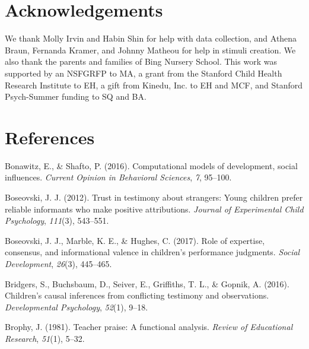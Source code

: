 \documentclass[10pt, letterpaper]{article}
\begin{document}
\section{Acknowledgements}\label{acknowledgements}

We thank Molly Irvin and Habin Shin for help with data collection, and
Athena Braun, Fernanda Kramer, and Johnny Matheou for help in stimuli
creation. We also thank the parents and families of Bing Nursery School.
This work was supported by an NSFGRFP to MA, a grant from the Stanford
Child Health Research Institute to EH, a gift from Kinedu, Inc. to EH
and MCF, and Stanford Psych-Summer funding to SQ and BA.

\vspace{1em}

\vspace{1em}

\section{References}\label{references}

\setlength{\parindent}{-0.1in} \setlength{\leftskip}{0.125in} \noindent

\hypertarget{refs}{}
\hypertarget{ref-bonawitz2016computational}{}
Bonawitz, E., \& Shafto, P. (2016). Computational models of development,
social influences. \emph{Current Opinion in Behavioral Sciences},
\emph{7}, 95--100.

\hypertarget{ref-boseovski2012trust}{}
Boseovski, J. J. (2012). Trust in testimony about strangers: Young
children prefer reliable informants who make positive attributions.
\emph{Journal of Experimental Child Psychology}, \emph{111}(3),
543--551.

\hypertarget{ref-boseovski2017role}{}
Boseovski, J. J., Marble, K. E., \& Hughes, C. (2017). Role of
expertise, consensus, and informational valence in children's
performance judgments. \emph{Social Development}, \emph{26}(3),
445--465.

\hypertarget{ref-Bridgers:2016ge}{}
Bridgers, S., Buchsbaum, D., Seiver, E., Griffiths, T. L., \& Gopnik, A.
(2016). Children's causal inferences from conflicting testimony and
observations. \emph{Developmental Psychology}, \emph{52}(1), 9--18.

\hypertarget{ref-brophy1981teacher}{}
Brophy, J. (1981). Teacher praise: A functional analysis. \emph{Review
of Educational Research}, \emph{51}(1), 5--32.
\end{document}
